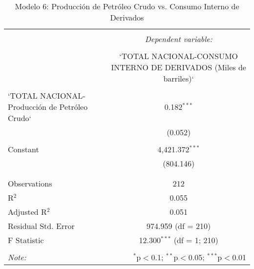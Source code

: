 
\begin{table}[!htbp] \centering 
  \caption{Modelo 6: Producción de Petróleo Crudo vs. Consumo Interno de Derivados} 
  \label{} 
\begin{tabular}{@{\extracolsep{5pt}}lc} 
\\[-1.8ex]\hline 
\hline \\[-1.8ex] 
 & \multicolumn{1}{c}{\textit{Dependent variable:}} \\ 
\cline{2-2} 
\\[-1.8ex] & `TOTAL NACIONAL-CONSUMO INTERNO DE DERIVADOS (Miles de barriles)` \\ 
\hline \\[-1.8ex] 
 `TOTAL NACIONAL-Producción de Petróleo Crudo` & 0.182$^{***}$ \\ 
  & (0.052) \\ 
  & \\ 
 Constant & 4,421.372$^{***}$ \\ 
  & (804.146) \\ 
  & \\ 
\hline \\[-1.8ex] 
Observations & 212 \\ 
R$^{2}$ & 0.055 \\ 
Adjusted R$^{2}$ & 0.051 \\ 
Residual Std. Error & 974.959 (df = 210) \\ 
F Statistic & 12.300$^{***}$ (df = 1; 210) \\ 
\hline 
\hline \\[-1.8ex] 
\textit{Note:}  & \multicolumn{1}{r}{$^{*}$p$<$0.1; $^{**}$p$<$0.05; $^{***}$p$<$0.01} \\ 
\end{tabular} 
\end{table} 
